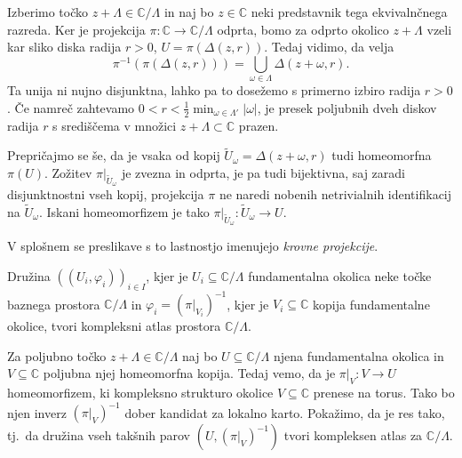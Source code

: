 \documentclass[mat1]{fmfdelo}
\numberwithin{equation}{section}
\newcommand{\C}{\mathbb C}
\newcommand{\om}{\omega}
\newcommand{\inv}{^{-1}}
\newcommand{\torus}{\C/\Lambda}
\newcommand{\abs}[1]{\left\lvert #1 \right\rvert}
\newcommand{\disk}[2]{\Delta(#1, #2)}
\newcommand{\tj}{tj.\ }
\theoremstyle{definition}
\begin{document}
\begin{dokaz}
    Izberimo točko $z + \Lambda \in \torus$ in naj bo $z \in \C$ neki predstavnik tega ekvivalnčnega razreda. Ker je projekcija $\pi: \C \to \torus$ odprta, bomo za odprto okolico $z + \Lambda$ vzeli kar sliko diska radija $r>0$, $U = \pi(\disk{z}{r})$. Tedaj vidimo, da velja 
    \[
        \pi\inv(\pi(\disk{z}{r})) = \bigcup_{\om \in \Lambda} \disk{z + \om}{r}.
    \] 
    Ta unija ni nujno disjunktna, lahko pa to dosežemo s primerno izbiro radija $r>0$. Če namreč zahtevamo $0 < r < \frac12 \min_{\om \in \Lambda'} \abs{\om}$, je presek poljubnih dveh diskov radija $r$ s središčema v množici $z + \Lambda \subset \C$ prazen. 

    Prepričajmo se še, da je vsaka od kopij $\tilde{U}_\om = \disk{z + \om}{r}$ tudi homeomorfna $\pi(U)$. Zožitev $\pi|_{\tilde{U}_\om}$ je zvezna in odprta, je pa tudi bijektivna, saj zaradi disjunktnostni vseh kopij, projekcija $\pi$ ne naredi nobenih netrivialnih identifikacij na $\tilde{U}_\om$. Iskani homeomorfizem je tako $\pi|_{\tilde{U}_\om} : \tilde{U}_\om \to U$.
\end{dokaz}

\begin{opomba}
    V splošnem se preslikave s to lastnostjo imenujejo \emph{krovne projekcije}.
\end{opomba}

\begin{trditev}
    Družina $((U_i, \varphi_i))_{i \in I}$, kjer je $U_i \subseteq \torus$ fundamentalna okolica neke točke baznega prostora $\torus$ in $\varphi_i = (\pi|_{V_i})\inv$, kjer je $V_i \subseteq \C$ kopija fundamentalne okolice, tvori kompleksni atlas prostora $\torus$.  
\end{trditev}

Za poljubno točko $z + \Lambda \in \torus$ naj bo $U \subseteq \torus$ njena fundamentalna okolica in $V \subseteq \C$ poljubna njej homeomorfna kopija. Tedaj vemo, da je $\pi|_V : V \to U$ homeomorfizem, ki kompleksno strukturo okolice $V \subseteq \C$ prenese na torus. Tako bo njen inverz $(\pi|_V)\inv$ dober kandidat za lokalno karto. Pokažimo, da je res tako, \tj da družina vseh takšnih parov $(U, (\pi|_V)\inv)$ tvori kompleksen atlas za $\torus$. 
\end{document}
